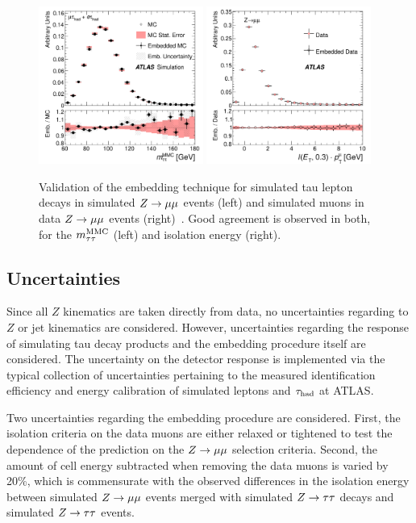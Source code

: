 \begin{figure}[tp]
  \centering
  \includegraphics[width=0.48\textwidth]{figures/HIGG-2013-32/fig_03b}
  \includegraphics[width=0.48\textwidth]{figures/HIGG-2013-32/fig_03a}
  \caption{Validation of the embedding technique for simulated tau lepton decays in simulated $Z \rightarrow \mu\mu$ events (left) and simulated muons in data $Z \rightarrow \mu\mu$ events (right)~\cite{HIGG-2013-32}. Good agreement is observed in both, for the $m_{\tau\tau}^\text{MMC}$ (left) and isolation energy (right).}
  \label{fig:backgrounds-embedding-validation}
\end{figure}

\subsection{Uncertainties}

Since all $Z$ kinematics are taken directly from data, no uncertainties regarding to $Z$ or jet kinematics are considered. However, uncertainties regarding the response of simulating tau decay products and the embedding procedure itself are considered. The uncertainty on the detector response is implemented via the typical collection of uncertainties pertaining to the measured identification efficiency and energy calibration of simulated leptons and $\tau_\text{had}$ at ATLAS.

Two uncertainties regarding the embedding procedure are considered. First, the isolation criteria on the data muons are either relaxed or tightened to test the dependence of the prediction on the $Z \rightarrow \mu\mu$ selection criteria. Second, the amount of cell energy subtracted when removing the data muons is varied by 20\%, which is commensurate with the observed differences in the isolation energy between simulated $Z \rightarrow \mu\mu$ events merged with simulated $Z\rightarrow\tau\tau$ decays and simulated $Z\rightarrow\tau\tau$ events.

